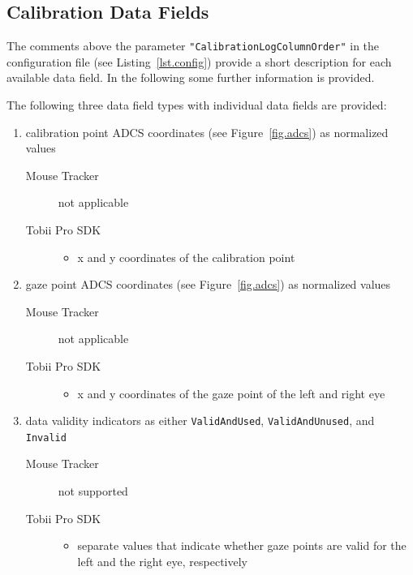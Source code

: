 \documentclass[a4paper,oneside]{book}
\begin{document}
\subsection{Calibration Data Fields}
The comments above the parameter \texttt{"CalibrationLogColumnOrder"} in the configuration file (see Listing~\ref{lst.config}) provide a short description for each available data field.
In the following some further information is provided.

The following three data field types with individual data fields are provided:
\begin{enumerate}
    \item calibration point ADCS coordinates (see Figure~\ref{fig.adcs}) as normalized values
        \begin{description}
            \item[Mouse Tracker] not applicable
            \item[Tobii Pro SDK] \hfill
                \begin{itemize}
                    \item x and y coordinates of the calibration point
                \end{itemize}
        \end{description}
    \item gaze point ADCS coordinates (see Figure~\ref{fig.adcs}) as normalized values
        \begin{description}
            \item[Mouse Tracker] not applicable
            \item[Tobii Pro SDK] \hfill
                \begin{itemize}
                    \item x and y coordinates of the gaze point of the left and right eye
                \end{itemize}
        \end{description}
    \item data validity indicators as either \texttt{ValidAndUsed}, \texttt{ValidAndUnused}, and \texttt{Invalid}
        \begin{description}
            \item[Mouse Tracker] not supported
            \item[Tobii Pro SDK] \hfill
                \begin{itemize}
                    \item separate values that indicate whether gaze points are valid for the left and the right eye, respectively
                \end{itemize}
        \end{description}
\end{enumerate}
\end{document}
